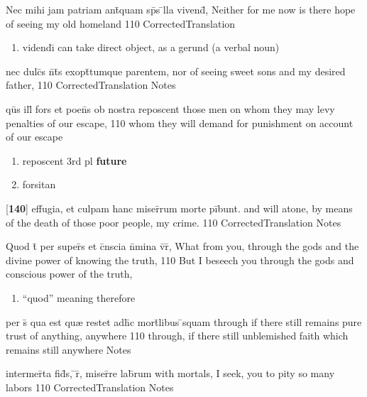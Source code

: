 \latline
  {Nec mihi jam patriam ant\={\macron {\i}}quam sp\={}s \={}lla vivend\={\macron {\i}},}
  { Neither for me now is there hope of seeing my old homeland}
  {110}
  { CorrectedTranslation }
  { \begin{enumerate}
  	\item vidend\={\i} can take direct object, as a gerund (a verbal noun)
  \end{enumerate} }


\latline
  {nec dulc\={\macron {\i}}s n\={}t\={}s exopt\={}tumque parentem,}
  { nor of seeing sweet sons and my desired father,}
  {110}
  { CorrectedTranslation }
  { Notes }


\latline
  {qu\={}s ill\={\macron {\i}} fors et poen\={}s ob nostra reposcent}
  { those men on whom they may levy penalties of our escape, }
  {110}
  { whom they will demand for punishment on account of our escape }
  { \begin{enumerate}
  	\item reposcent 3rd pl \textbf{future}
  	\item forsitan
  \end{enumerate} }


\latline
  {[\textbf{140}] effugia, et culpam hanc miser\={}rum morte pi\={}bunt.}
  { and will atone, by means of the death of those poor people, my crime.  }
  {110}
  { CorrectedTranslation }
  { Notes }


\latline
  {Quod t\={} per super\={}s et c\={}nscia n\={}mina v\={}r\={\macron {\i}},}
  { What from you, through the gods and the divine power of knowing the truth, }
  {110}
  { But I beseech you through the gods and conscious power of the truth,  }
  { \begin{enumerate}
  	\item ``quod'' meaning therefore
  \end{enumerate} }


\latline
  {per s\={\macron {\i}} qua est qu{\ae} restet adh\={}c mort\={}libus \={}squam}
  { through if there still remains pure trust of anything, anywhere  }
  {110}
  { through, if there still unblemished faith which remains still anywhere }
  { Notes }


\latline
  {intermer\={}ta fid\={}s, \={}r\={}, miser\={}re lab\={}rum}
  { with mortals, I seek, you to pity so many labors }
  {110}
  { CorrectedTranslation }
  { Notes }


